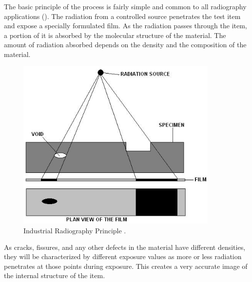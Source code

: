 The basic principle of the process is fairly simple and common to all radiography applications (). The radiation from a controlled source penetrates the test item and expose a specially formulated film. As the radiation passes through the item, a portion of it is absorbed by the molecular structure of the material. The amount of radiation absorbed depends on the density and the composition of the material.

\begin{figure}[htbp]
	\centering
		\includegraphics[width=10cm]{Figures/1.png}
	\caption[Industrial Radiography Principle]{Industrial Radiography Principle \citep{irprinciple}.}%
	\label{fig:1}
\end{figure}

As cracks, fissures, and any other defects in the material have different densities, they will be characterized by different exposure values as more or less radiation penetrates at those points during exposure. This creates a very accurate image of the internal structure of the item.

